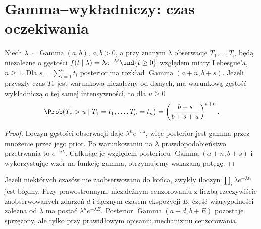 \section{Gamma--wykładniczy: czas oczekiwania}
\begin{twierdzenie}
Niech $\lambda\sim\operatorname{Gamma}(a,b)$, $a,b>0$,
a przy znanym $\lambda$ obserwacje $T_1,\ldots,T_n$
będą niezależne o gęstości
$f(t\mid\lambda)=\lambda e^{-\lambda t}\ind{t\ge0}$
względem miary Lebesgue'a, $n\ge1$.
Dla $s=\sum_{i=1}^n t_i$ posterior ma rozkład
$\operatorname{Gamma}(a+n,b+s)$.
Jeżeli przyszły czas $T_*$ jest warunkowo niezależny od danych,
ma warunkową gęstość wykładniczą o tej samej intensywności,
to dla $u\ge0$
\[
 \Prob(T_*>u\mid T_1=t_1,\ldots,T_n=t_n)
 =\left(\frac{b+s}{b+s+u}\right)^{a+n}.
\]
\end{twierdzenie}
\begin{proof}
Iloczyn gęstości obserwacji daje $\lambda^n e^{-s\lambda}$,
więc posterior jest gamma przez mnożenie przez jego prior.
Po warunkowaniu na $\lambda$ prawdopodobieństwo przetrwania
to $e^{-u\lambda}$. Całkując je względem posterioru
$\operatorname{Gamma}(a+n,b+s)$ i wykorzystując wzór na
funkcję gamma, otrzymujemy wskazaną potęgę.
\end{proof}

\begin{uwaga}
Jeżeli niektórych czasów nie zaobserwowano do końca, zwykły
iloczyn $\prod_i\lambda e^{-\lambda t_i}$ jest błędny.
Przy prawostronnym, niezależnym cenzorowaniu z liczbą
rzeczywiście zaobserwowanych zdarzeń $d$ i łącznym czasem
ekspozycji $E$, część wiarygodności zależna od $\lambda$
ma postać $\lambda^d e^{-\lambda E}$. Posterior
$\operatorname{Gamma}(a+d,b+E)$ pozostaje sprzężony,
ale tylko przy prawidłowym opisaniu mechanizmu cenzorowania.
\end{uwaga}


